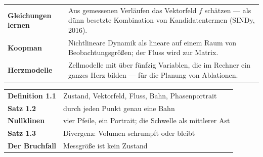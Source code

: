 \begin{forschung}
\begin{center}
{\small
\renewcommand{\arraystretch}{1.45}
\begin{tabular}{@{}P{3.0cm}P{5.2cm}@{}}
\toprule
\textbf{Gleichungen lernen} & Aus gemessenen Verläufen das Vektorfeld $f$ schätzen --- als dünn besetzte Kombination von Kandidatentermen (SINDy, 2016).\\
\textbf{Koopman} & Nichtlineare Dynamik als lineare auf einem Raum von Beobachtungsgrößen; der Fluss wird zur Matrix.\\
\textbf{Herzmodelle} & Zellmodelle mit über fünfzig Variablen, die im Rechner ein ganzes Herz bilden --- für die Planung von Ablationen.\\
\bottomrule
\end{tabular}}
\end{center}

\begin{center}
\begin{minipage}{0.88\textwidth}
\end{minipage}
\end{center}
\end{forschung}

\begin{merksatz}
\begin{center}
\renewcommand{\arraystretch}{1.5}
\begin{tabular}{@{}P{3.0cm}P{5.6cm}@{}}
\toprule
\textbf{Definition 1.1} & Zustand, Vektorfeld, Fluss, Bahn, Phasenportrait\\
\textbf{Satz 1.2} & durch jeden Punkt genau eine Bahn\\
\textbf{Nullklinen} & vier Pfeile, ein Portrait; die Schwelle als mittlerer Ast\\
\textbf{Satz 1.3} & Divergenz: Volumen schrumpft oder bleibt\\
\textbf{Der Bruchfall} & Messgröße ist kein Zustand\\
\bottomrule
\end{tabular}
\end{center}

\begin{center}
\begin{minipage}{0.88\textwidth}
\end{minipage}
\end{center}
\end{merksatz}

